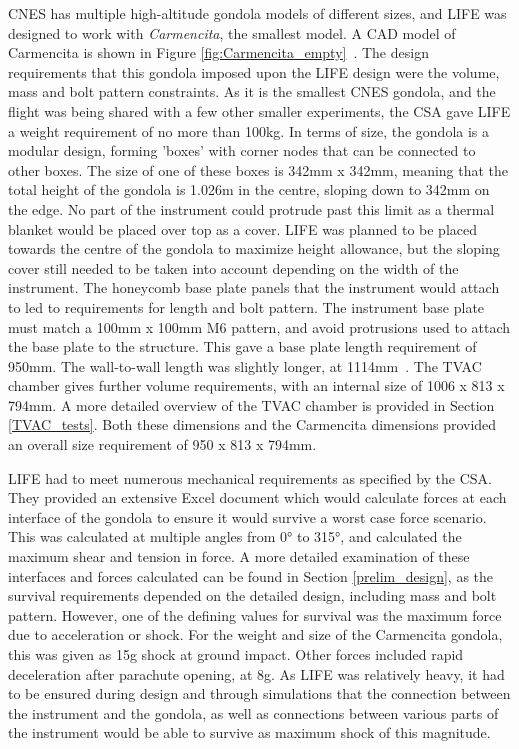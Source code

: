 CNES has multiple high-altitude gondola models of different sizes, and LIFE was designed to work with \textit{Carmencita}, the smallest model. A CAD model of Carmencita is shown in Figure \ref{fig:Carmencita_empty}~\citep{STRATOS_CARMENCITA_doc}. The design requirements that this gondola imposed upon the LIFE design were the volume, mass and bolt pattern constraints. As it is the smallest CNES gondola, and the flight was being shared with a few other smaller experiments, the CSA gave LIFE a weight requirement of no more than 100kg. In terms of size, the gondola is a modular design, forming 'boxes' with corner nodes that can be connected to other boxes. The size of one of these boxes is 342mm x 342mm, meaning that the total height of the gondola is 1.026m in the centre, sloping down to 342mm on the edge. No part of the instrument could protrude past this limit as a thermal blanket would be placed over top as a cover. LIFE was planned to be placed towards the centre of the gondola to maximize height allowance, but the sloping cover still needed to be taken into account depending on the width of the instrument. The honeycomb base plate panels that the instrument would attach to led to requirements for length and bolt pattern. The instrument base plate must match a 100mm x 100mm M6 pattern, and avoid protrusions used to attach the base plate to the structure. This gave a base plate length requirement of 950mm. The wall-to-wall length was slightly longer, at 1114mm~\citep{STRATOS_CARMENCITA_doc}. The TVAC chamber gives further volume requirements, with an internal size of 1006 x 813 x 794mm. A more detailed overview of the TVAC chamber is provided in Section \ref{TVAC_tests}. Both these dimensions and the Carmencita dimensions provided an overall size requirement of 950 x 813 x 794mm. 

LIFE had to meet numerous mechanical requirements as specified by the CSA. They provided an extensive Excel document which would calculate forces at each interface of the gondola to ensure it would survive a worst case force scenario. This was calculated at multiple angles from 0° to 315°, and calculated the maximum shear and tension in force. A more detailed examination of these interfaces and forces calculated can be found in Section \ref{prelim_design}, as the survival requirements depended on the detailed design, including mass and bolt pattern. However, one of the defining values for survival was the maximum force due to acceleration or shock. For the weight and size of the Carmencita gondola, this was given as 15g shock at ground impact. Other forces included rapid deceleration after parachute opening, at 8g. As LIFE was relatively heavy, it had to be ensured during design and through simulations that the connection between the instrument and the gondola, as well as connections between various parts of the instrument would be able to survive as maximum shock of this magnitude.

